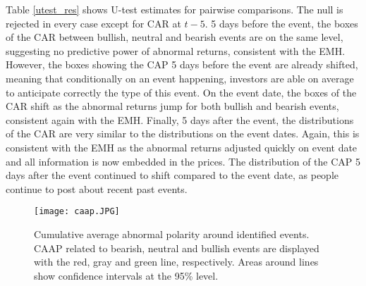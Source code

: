 Table \ref{utest_res} shows U-test estimates for pairwise comparisons. The null is rejected in every case except for CAR at $t-5$. 5 days before the event, the boxes of the CAR between bullish, neutral and bearish events are on the same level, suggesting no predictive power of abnormal returns, consistent with the EMH. However, the boxes showing the CAP 5 days before the event are already shifted, meaning that conditionally on an event happening, investors are able on average to anticipate correctly the type of this event. On the event date, the boxes of the CAR shift as the abnormal returns jump for both bullish and bearish events, consistent again with the EMH. Finally, 5 days after the event, the distributions of the CAR are very similar to the distributions on the event dates. Again, this is consistent with the EMH as the abnormal returns adjusted quickly on event date and all information is now embedded in the prices. The distribution of the CAP 5 days after the event continued to shift compared to the event date, as people continue to post about recent past events.

\begin{figure}[]
    \centering
    \texttt{[image: caap.JPG]}
    \caption{Cumulative average abnormal polarity around identified events. CAAP related to bearish, neutral and bullish events are displayed with the red, gray and green line, respectively. Areas around lines show confidence intervals at the 95\% level.}
    \label{fig:ES_cum_abn_pol_MM}
\end{figure}

